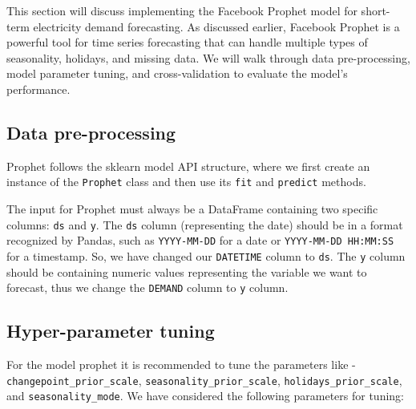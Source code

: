 \documentclass[mstat,12pt]{unswthesis}
\begin{document}
This section will discuss implementing the Facebook Prophet model for
short-term electricity demand forecasting. As discussed earlier,
Facebook Prophet is a powerful tool for time series forecasting that can
handle multiple types of seasonality, holidays, and missing data. We
will walk through data pre-processing, model parameter tuning, and
cross-validation to evaluate the model's performance.

\subsection{Data pre-processing}\label{data-pre-processing}

Prophet follows the sklearn model API structure, where we first create
an instance of the \texttt{Prophet} class and then use its \texttt{fit}
and \texttt{predict} methods.

The input for Prophet must always be a DataFrame containing two specific
columns: \texttt{ds} and \texttt{y}. The \texttt{ds} column
(representing the date) should be in a format recognized by Pandas, such
as \texttt{YYYY-MM-DD} for a date or \texttt{YYYY-MM-DD\ HH:MM:SS} for a
timestamp. So, we have changed our \texttt{DATETIME} column to
\texttt{ds}. The \texttt{y} column should be containing numeric values
representing the variable we want to forecast, thus we change the
\texttt{DEMAND} column to \texttt{y} column.

\subsection{Hyper-parameter tuning}\label{hyper-parameter-tuning}

For the model prophet it is recommended to tune the parameters like -
\linebreak \texttt{changepoint\_prior\_scale},
\texttt{seasonality\_prior\_scale}, \texttt{holidays\_prior\_scale}, and
\texttt{seasonality\_mode}. We have considered the following parameters
for tuning:
\end{document}
